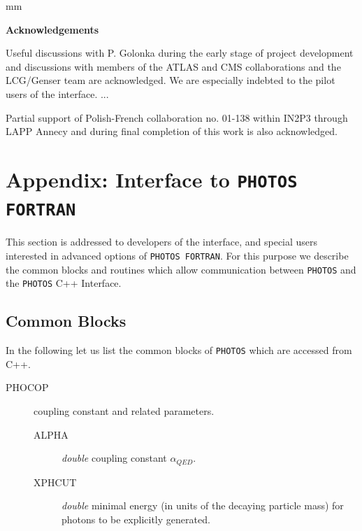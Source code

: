 \documentclass[]{Photos_interface_design}
\begin{document}
 mm

\centerline{\large\bf Acknowledgements}


Useful discussions with P. Golonka during the early stage of project development and discussions 
with members of the ATLAS and CMS collaborations and the LCG/Genser team 
are acknowledged.
We are especially indebted to the pilot users of the interface.
...

Partial support of Polish-French collaboration
no. 01-138 within IN2P3 through LAPP Annecy and 
during final completion of this work is
also acknowledged.

\newpage

{}
% 






\newpage
\appendix

\section{Appendix: Interface to {\tt PHOTOS FORTRAN}}
\label{Interface to PHOTOS}

This section is addressed to developers of the interface, 
and special users interested in advanced options of {\tt PHOTOS FORTRAN}.
For this purpose we describe the common blocks and routines which allow
communication between {\tt PHOTOS} and the {\tt PHOTOS} C++ Interface.

\subsection{Common Blocks}

In the following let us list the common blocks of {\tt PHOTOS} which are accessed
from C++.

\begin{description}
\item[PHOCOP] coupling constant and related parameters.
    \begin{description}
	\item[ALPHA]  \textit{double} coupling constant $\alpha_{QED}$.
	\item[XPHCUT] \textit{double} minimal energy (in units of the decaying particle mass) for photons to be explicitly generated.
    \end{description}
\end{description}
\end{document}
